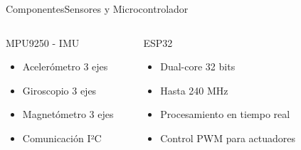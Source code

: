 \documentclass[10pt,xcolor={dvipsnames}]{beamer}
\begin{document}
\begin{frame}{Componentes}{Sensores y Microcontrolador}

\begin{columns}
\begin{block}{MPU9250 - IMU}
\begin{itemize}
    \item Acelerómetro 3 ejes
    \item Giroscopio 3 ejes
    \item Magnetómetro 3 ejes
    \item Comunicación I²C
\end{itemize}
\end{block}

\begin{center}
\end{center}

\begin{block}{ESP32}
\begin{itemize}
    \item Dual-core 32 bits
    \item Hasta 240 MHz
    \item Procesamiento en tiempo real
    \item Control PWM para actuadores
\end{itemize}
\end{block}

\begin{center}
\end{center}
\end{columns}
\end{frame}
\end{document}
